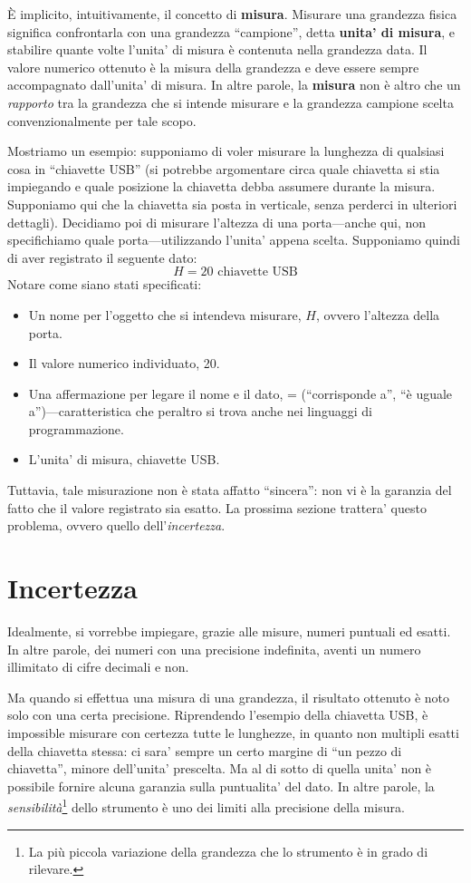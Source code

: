 È implicito, intuitivamente, il concetto di \textbf{misura}. Misurare una grandezza
fisica significa confrontarla con una grandezza ``campione'', detta \textbf{unita'
di misura}, e stabilire quante volte l'unita' di misura è contenuta nella
grandezza data. Il valore numerico ottenuto è la misura della grandezza e deve
essere sempre accompagnato dall'unita' di misura.
In altre parole, la \textbf{misura} non è altro che un \textit{rapporto} tra la
grandezza che si intende misurare e la grandezza campione scelta convenzionalmente
per tale scopo.

Mostriamo un esempio: supponiamo di voler misurare la lunghezza di qualsiasi cosa
in ``chiavette USB'' (si potrebbe argomentare circa quale chiavetta si stia
impiegando e quale posizione la chiavetta debba assumere durante la misura.
Supponiamo qui che la chiavetta sia posta in verticale, senza perderci in ulteriori
dettagli). Decidiamo poi di misurare l'altezza di una porta—anche qui, non
specifichiamo quale porta—utilizzando l'unita' appena scelta. Supponiamo quindi
di aver registrato il seguente dato:
\[ H = 20 \text{ chiavette USB} \]
Notare come siano stati specificati:
\begin{itemize}
    \item Un nome per l'oggetto che si intendeva misurare, $H$, ovvero l'altezza
    della porta.
    \item Il valore numerico individuato, 20.
    \item Una affermazione per legare il nome e il dato, = (``corrisponde a'', ``è
    uguale a'')—caratteristica che peraltro si trova anche nei linguaggi di
    programmazione.
    \item L'unita' di misura, chiavette USB.
\end{itemize}
Tuttavia, tale misurazione non è stata affatto ``sincera'': non vi è la
garanzia del fatto che il valore registrato sia esatto. La prossima sezione
trattera' questo problema, ovvero quello dell'\textit{incertezza}.


\section{Incertezza}
Idealmente, si vorrebbe impiegare, grazie alle misure, numeri puntuali ed esatti.
In altre parole, dei numeri con una precisione indefinita, aventi un numero
illimitato di cifre decimali e non.

Ma quando si effettua una misura di una grandezza, il risultato ottenuto è noto solo
con una certa precisione. Riprendendo l'esempio della chiavetta USB, è impossible
misurare con certezza tutte le lunghezze, in quanto non multipli esatti della
chiavetta stessa: ci sara' sempre un certo margine di ``un pezzo di chiavetta'',
minore dell'unita' prescelta. Ma al di sotto di quella unita' non è possibile
fornire alcuna garanzia sulla puntualita' del dato. In altre parole, la
\textit{sensibilità}\footnote{La più piccola variazione della grandezza che lo
strumento è in grado di rilevare.} dello strumento è uno dei limiti alla precisione
della misura.

